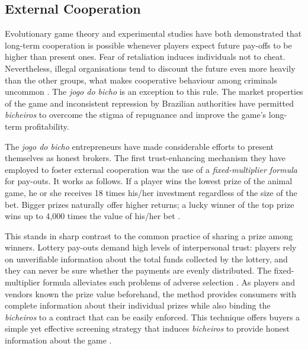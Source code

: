 \subsection{External Cooperation}
\label{sub:external}

Evolutionary game theory \citep{axelrod1984evolution, axelrod1985achieving, smith1982evolution} and experimental studies \citep{dawes1977behavior, isaac1984divergent, kim1984free, marwell1981economists} have both demonstrated that long-term cooperation is possible whenever players expect future pay-offs to be higher than present ones. Fear of retaliation induces individuals not to cheat. Nevertheless, illegal organisations tend to discount the future even more heavily than the other groups, what makes cooperative behaviour among criminals uncommon \citep{gambetta2009codes, skarbek2011governance,skarbek2012prison,skarbek2014social}. The \emph{jogo do bicho} is an exception to this rule. The market properties of the game and inconsistent repression by Brazilian authorities have permitted \emph{bicheiros} to overcome the stigma of repugnance and improve the game's long-term profitability.

The \emph{jogo do bicho} entrepreneurs have made considerable efforts to present themselves as honest brokers. The first trust-enhancing mechanism they have employed to foster external cooperation was the use of a \emph{fixed-multiplier formula} for pay-outs. It works as follows. If a player wins the lowest prize of the animal game, he or she receives 18 times his/her investment regardless of the size of the bet. Bigger prizes naturally offer higher returns; a lucky winner of the top prize wins up to 4,000 times the value of his/her bet \citetext{\citealp[89]{labronici2012paratodos}; \citealp[20]{magalhaes2005ganhou}}.

This stands in sharp contrast to the common practice of sharing a prize among winners. Lottery pay-outs demand high levels of interpersonal trust: players rely on unverifiable information about the total funds collected by the lottery, and they can never be sure whether the payments are evenly distributed. The fixed-multiplier formula alleviates such problems of adverse selection \citep{akerlof1970market, cohen2010testing, levin2001information}. As players and vendors known the prize value beforehand, the method provides consumers with complete information about their individual prizes while also binding the \emph{bicheiros} to a contract that can be easily enforced. This technique offers buyers a simple yet effective screening strategy that induces \emph{bicheiros} to provide honest information about the game \citep{spence1973job, stiglitz1981credit}.


